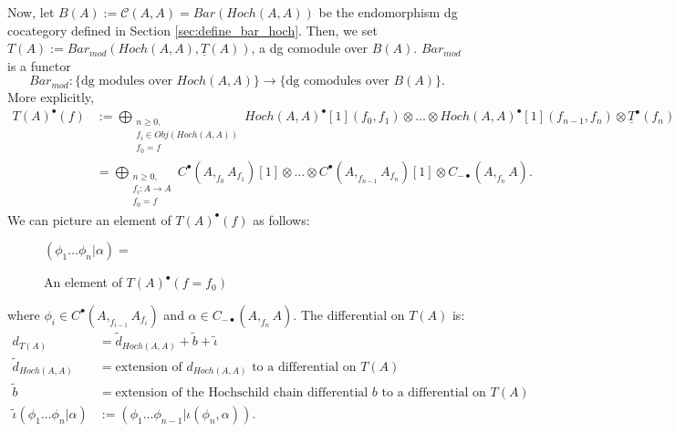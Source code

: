 Now, let $B(A) := \mathcal{C}(A,A) = 
Bar(Hoch(A,A))$ be the 
endomorphism dg cocategory 
defined in Section \ref{sec:define_bar_hoch}. 
Then, we set $T(A):= Bar_{mod}(Hoch(A,A), 
\underline{T}(A))$, a dg comodule over $B(A)$. 
$Bar_{mod}$ is a functor
$$Bar_{mod}: \{\textrm{dg modules over }Hoch(A,A)\} \to 
\{\textrm{dg comodules over }B(A)\}.$$
More explicitly, 
%
\begin{align*}
T(A)^\bullet(f) 
&:= \bigoplus \limits_{\substack{
	n \geq 0,\\
	f_i \in Obj(Hoch(A,A))\\
	f_0 = f}}
Hoch(A,A)^\bullet[1](f_0,f_1) \otimes 
\dots \otimes 
Hoch(A,A)^\bullet[1](f_{n-1},f_n) \otimes 
\underline{T}^\bullet(f_n)\\
&= \bigoplus \limits_{\substack{
	n \geq 0,\\
	f_i:A \to A\\
	f_0 = f}}
C^\bullet(A,  _{f_0}A_{f_1})[1] \otimes \dots \otimes 
C^\bullet(A, _{f_{n-1}}A_{f_n})[1] \otimes 
C_{-\bullet}(A, _{f_n}A ).
\end{align*}
%
We can picture an element of $T(A)^\bullet(f)$ 
as follows:
%
\begin{figure}[H]
\centerline{
$(\phi_1 \dots \phi_n| \alpha) = $
}
\caption{An element of $T(A)^\bullet(f=f_0)$} 
 \label{fig:phi|alpha}
\end{figure}
%
where $\phi_i \in C^\bullet(A, _{f_{i-1}}A_{f_i})$
and $\alpha \in C_{-\bullet}(A, _{f_n}A)$. The 
differential on $T(A)$ is:
%
\begin{align*}
d_{T(A)} 
&=
\tilde{d}_{Hoch(A,A)} + \tilde{b} + \tilde{\iota}\\
%
\tilde{d}_{Hoch(A,A)} 
&=
\textrm{extension of $d_{Hoch(A,A)}$ 
to a differential on $T(A)$}\\
%
\tilde{b}
&=
\textrm{extension of the Hochschild chain 
differential $b$ to a differential on $T(A)$}\\
%
\tilde{\iota}(\phi_1 \dots \phi_n|\alpha) 
&:=
(\phi_1 \dots \phi_{n-1}| \iota(\phi_n, \alpha)).
\end{align*}
